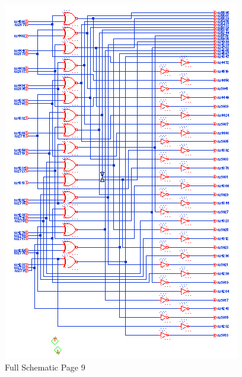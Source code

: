 \documentclass[11pt]{article}
\begin{document}
		
		\begin{figure}[H] 
			\centering 
			\includegraphics[width=\textwidth,height=\dimexpr\textheight-4\baselineskip-\abovecaptionskip-\belowcaptionskip\relax,keepaspectratio]{"Pictures/Full Schematic Page 9"}
			\caption{Full Schematic Page 9} 
			\label{fig:Full-Schematic-Page-9} 
		\end{figure}
		
\end{document}
